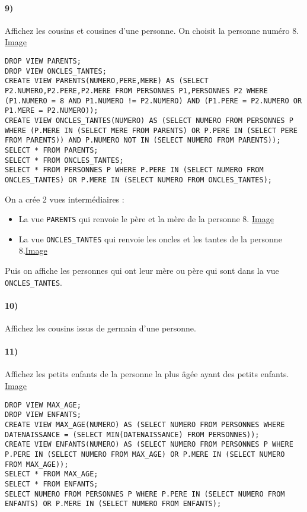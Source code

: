 \documentclass{report}
\begin{document}
\paragraph{9)}Affichez les cousins et cousines d'une personne. On choisit la personne numéro 8. \href{run:./Images/TP7/tp7_9.png}{Image}

\begin{lstlisting}
DROP VIEW PARENTS;
DROP VIEW ONCLES_TANTES;
CREATE VIEW PARENTS(NUMERO,PERE,MERE) AS (SELECT P2.NUMERO,P2.PERE,P2.MERE FROM PERSONNES P1,PERSONNES P2 WHERE (P1.NUMERO = 8 AND P1.NUMERO != P2.NUMERO) AND (P1.PERE = P2.NUMERO OR P1.MERE = P2.NUMERO));
CREATE VIEW ONCLES_TANTES(NUMERO) AS (SELECT NUMERO FROM PERSONNES P WHERE (P.MERE IN (SELECT MERE FROM PARENTS) OR P.PERE IN (SELECT PERE FROM PARENTS)) AND P.NUMERO NOT IN (SELECT NUMERO FROM PARENTS));
SELECT * FROM PARENTS;
SELECT * FROM ONCLES_TANTES;
SELECT * FROM PERSONNES P WHERE P.PERE IN (SELECT NUMERO FROM ONCLES_TANTES) OR P.MERE IN (SELECT NUMERO FROM ONCLES_TANTES);
\end{lstlisting}

On a crée 2 vues intermédiaires :
\begin{itemize}
	\item La vue {\tt PARENTS} qui renvoie le père et la mère de la personne 8. \href{run:./Images/TP7/tp7_vue5.png}{Image}
	\item La vue {\tt ONCLES\_TANTES} qui renvoie les oncles et les tantes de la personne 8.\href{run:./Images/TP7/tp7_vue6.png}{Image}
\end{itemize}

Puis on affiche les personnes qui ont leur mère ou père qui sont dans la vue {\tt ONCLES\_TANTES}.

\paragraph{10)}Affichez les cousins issus de germain d'une personne.

\paragraph{11)}Affichez les petits enfants de la personne la plus âgée ayant des petits enfants. \href{run:./Images/TP7/tp7_11.png}{Image}

\begin{lstlisting}
DROP VIEW MAX_AGE;
DROP VIEW ENFANTS;
CREATE VIEW MAX_AGE(NUMERO) AS (SELECT NUMERO FROM PERSONNES WHERE DATENAISSANCE = (SELECT MIN(DATENAISSANCE) FROM PERSONNES));
CREATE VIEW ENFANTS(NUMERO) AS (SELECT NUMERO FROM PERSONNES P WHERE P.PERE IN (SELECT NUMERO FROM MAX_AGE) OR P.MERE IN (SELECT NUMERO FROM MAX_AGE));
SELECT * FROM MAX_AGE;
SELECT * FROM ENFANTS;
SELECT NUMERO FROM PERSONNES P WHERE P.PERE IN (SELECT NUMERO FROM ENFANTS) OR P.MERE IN (SELECT NUMERO FROM ENFANTS);
\end{lstlisting}
\end{document}
